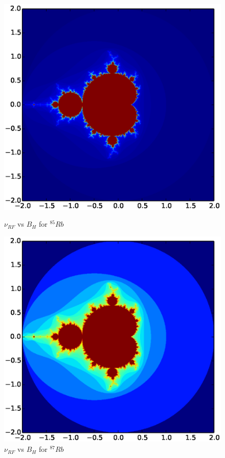 \documentclass[11pt]{article}
\begin{document}
\begin{figure}[H]
  \centering
  \begin{minipage}[t]{0.4\textwidth}
    \centering
    \vspace{0pt}
    \includegraphics[scale=0.42]{mandel_2.eps}
    \caption{\scriptsize $\nu_{RF}$ vs $B_{H}$ for $^{85}Rb$}
  \end{minipage} \hfill
  \begin{minipage}[t]{0.4\textwidth}
    \centering
    \vspace{0pt}
    \includegraphics[scale=0.42]{mandel_3.eps}
    \caption{\scriptsize $\nu_{RF}$ vs $B_{H}$ for $^{87}Rb$}
  \end{minipage}
\end{figure}
\end{document}
